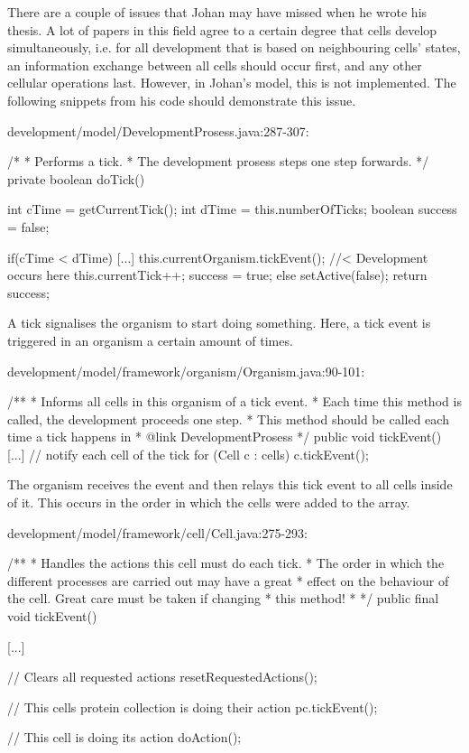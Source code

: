 There are a couple of issues that Johan may have missed when he wrote his thesis. A lot of papers in this field agree to a certain degree that cells develop simultaneously, i.e. for all development that is based on neighbouring cells' states, an information exchange between all cells should occur first, and any other cellular operations last. However, in Johan's model, this is not implemented. The following snippets from his code should demonstrate this issue.

\begin{verbatimtab}
development/model/DevelopmentProsess.java:287-307:

/*
 * Performs a tick.
 * The development prosess steps one step forwards.
 */
private boolean doTick() {
	int cTime = getCurrentTick();
	int dTime = this.numberOfTicks;
	boolean success = false;

	if(cTime < dTime) {
		[...]
		this.currentOrganism.tickEvent(); //< Development occurs here
		this.currentTick++;
		success = true;
	} else {
		setActive(false);
	}
	return success;
}
\end{verbatimtab}

A tick signalises the organism to start doing something. Here, a tick event is triggered in an organism a certain amount of times.

\begin{verbatimtab}
development/model/framework/organism/Organism.java:90-101:

/**
 * Informs all cells in this organism of a tick event.
 * Each time this method is called, the development proceeds one step.
 * This method should be called each time a tick happens in
 * {@link DevelopmentProsess}
 */
public void tickEvent() {
	[...]
	// notify each cell of the tick
	for (Cell c : cells) {
		c.tickEvent();
	}
}
\end{verbatimtab}

The organism receives the event and then relays this tick event to all cells inside of it. This occurs in the order in which the cells were added to the array.

\begin{verbatimtab}
development/model/framework/cell/Cell.java:275-293:

/**
 * Handles the actions this cell must do each tick.
 * The order in which the different processes are carried out may have a great
 * effect on the behaviour of the cell. Great care must be taken if changing
 * this method!
 *
 */
public final void tickEvent() {
	[...]

	// Clears all requested actions
	resetRequestedActions();

	// This cells protein collection is doing their action
	pc.tickEvent();

	// This cell is doing its action
	doAction();
}
\end{verbatimtab}

